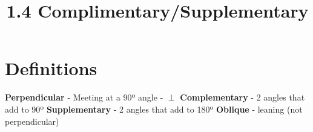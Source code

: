 \documentclass{article}
\begin{document}
	
	\setlength{\droptitle}{-5em}
	\title{1.4 Complimentary/Supplementary}
	\date{}
	\author{}
	\maketitle
	
	\section{Definitions}
	\textbf{Perpendicular} - Meeting at a 90º angle - $\perp$ \newline \newline
	\textbf{Complementary} - 2 angles that add to 90º \newline \newline
	\textbf{Supplementary} - 2 angles that add to 180º \newline \newline
	\textbf{Oblique} - leaning (not perpendicular) 
\end{document}
